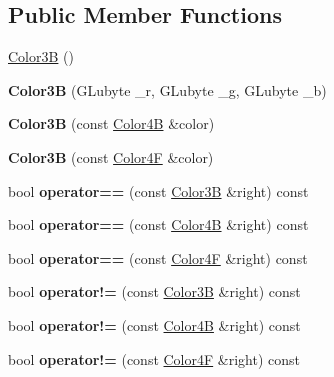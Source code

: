 \subsection*{Public Member Functions}
\begin{DoxyCompactItemize}
\item 
\hyperlink{structColor3B_a909738e02ed21bd3c29283cf379cc1f8}{Color3B} ()
\item 
\mbox{\label{structColor3B_af54ca53b126e684f0d0a0939e8b9a825}} 
{\bfseries Color3B} (G\+Lubyte \+\_\+r, G\+Lubyte \+\_\+g, G\+Lubyte \+\_\+b)
\item 
\mbox{\label{structColor3B_aae1644a34d0da536c8dab2e273b7943b}} 
{\bfseries Color3B} (const \hyperlink{structColor4B}{Color4B} \&color)
\item 
\mbox{\label{structColor3B_afcc265c9313e53defcb6b0b8c33a3eb9}} 
{\bfseries Color3B} (const \hyperlink{structColor4F}{Color4F} \&color)
\item 
\mbox{\label{structColor3B_acdcdc62fd4de7ad43c51b8cce1523589}} 
bool {\bfseries operator==} (const \hyperlink{structColor3B}{Color3B} \&right) const
\item 
\mbox{\label{structColor3B_a63f025afa2f24de1fa9fb23359a9a7bd}} 
bool {\bfseries operator==} (const \hyperlink{structColor4B}{Color4B} \&right) const
\item 
\mbox{\label{structColor3B_a4e8034e6ec340ffbf9e8c3f9793117d9}} 
bool {\bfseries operator==} (const \hyperlink{structColor4F}{Color4F} \&right) const
\item 
\mbox{\label{structColor3B_aa10d737d3b4a62e9cdd2d15a28973555}} 
bool {\bfseries operator!=} (const \hyperlink{structColor3B}{Color3B} \&right) const
\item 
\mbox{\label{structColor3B_ab633b847b14fde6f7a605cda46938d0d}} 
bool {\bfseries operator!=} (const \hyperlink{structColor4B}{Color4B} \&right) const
\item 
\mbox{\label{structColor3B_a905040bdac0286913e4474630eaa125b}} 
bool {\bfseries operator!=} (const \hyperlink{structColor4F}{Color4F} \&right) const

\end{DoxyCompactItemize}
